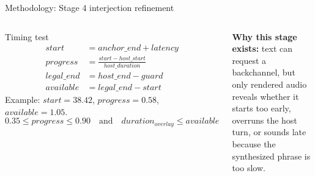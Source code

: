 \documentclass[aspectratio=169,10pt]{beamer}
\begin{document}
\begin{frame}{Methodology: Stage 4 interjection refinement}
\begin{columns}[T,totalwidth=\textwidth]
\begin{block}{Timing test}
{\fontsize{5.9}{6.45}\selectfont
\begin{align*}
start &= anchor\_end + latency \\
progress &= \frac{start-host\_start}{host\_duration} \\
legal\_end &= host\_end - guard \\
available &= legal\_end - start
\end{align*}
Example: \(start=38.42\), \(progress=0.58\), \(available=1.05\).
\[
0.35 \le progress \le 0.90 \quad\text{and}\quad duration_{overlay} \le available
\]
}
\end{block}
\vspace{0.15em}
{\fontsize{5.95}{6.55}\selectfont
\textbf{Why this stage exists:} text can request a backchannel, but only rendered audio reveals whether it starts too early, overruns the host turn, or sounds late because the synthesized phrase is too slow.
}
\end{columns}
\end{frame}
\end{document}
